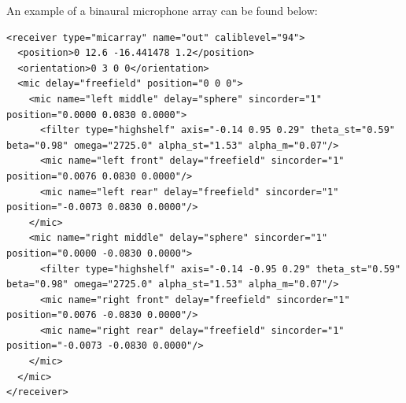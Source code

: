 An example of a binaural microphone array can be found below:
\begin{lstlisting}[numbers=none]
<receiver type="micarray" name="out" caliblevel="94">
  <position>0 12.6 -16.441478 1.2</position>
  <orientation>0 3 0 0</orientation>
  <mic delay="freefield" position="0 0 0">
    <mic name="left middle" delay="sphere" sincorder="1" position="0.0000 0.0830 0.0000">
      <filter type="highshelf" axis="-0.14 0.95 0.29" theta_st="0.59" beta="0.98" omega="2725.0" alpha_st="1.53" alpha_m="0.07"/>
      <mic name="left front" delay="freefield" sincorder="1" position="0.0076 0.0830 0.0000"/>
      <mic name="left rear" delay="freefield" sincorder="1" position="-0.0073 0.0830 0.0000"/>
    </mic>
    <mic name="right middle" delay="sphere" sincorder="1" position="0.0000 -0.0830 0.0000">
      <filter type="highshelf" axis="-0.14 -0.95 0.29" theta_st="0.59" beta="0.98" omega="2725.0" alpha_st="1.53" alpha_m="0.07"/>
      <mic name="right front" delay="freefield" sincorder="1" position="0.0076 -0.0830 0.0000"/>
      <mic name="right rear" delay="freefield" sincorder="1" position="-0.0073 -0.0830 0.0000"/>
    </mic>
  </mic>
</receiver>
\end{lstlisting}
